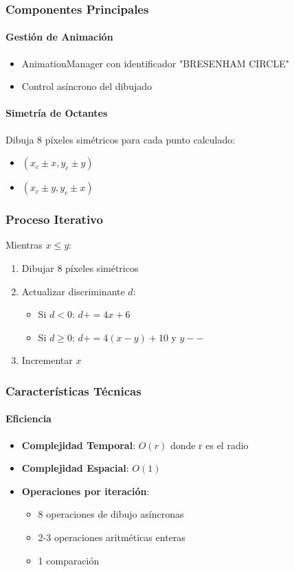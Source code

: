 \documentclass[12pt]{article}
\begin{document}
\subsubsection{Componentes Principales}
\paragraph{Gestión de Animación}
\begin{itemize}
    \item AnimationManager con identificador "BRESENHAM CIRCLE"
    \item Control asíncrono del dibujado
\end{itemize}

\paragraph{Simetría de Octantes}
Dibuja 8 píxeles simétricos para cada punto calculado:
\begin{itemize}
    \item $(x_c \pm x, y_c \pm y)$
    \item $(x_c \pm y, y_c \pm x)$
\end{itemize}

\subsubsection{Proceso Iterativo}
Mientras $x \leq y$:
\begin{enumerate}
    \item Dibujar 8 píxeles simétricos
    \item Actualizar discriminante $d$:
    \begin{itemize}
        \item Si $d < 0$: $d += 4x + 6$
        \item Si $d \geq 0$: $d += 4(x-y) + 10$ y $y--$
    \end{itemize}
    \item Incrementar $x$
\end{enumerate}

\subsubsection{Características Técnicas}
\paragraph{Eficiencia}
\begin{itemize}
    \item \textbf{Complejidad Temporal}: $O(r)$ donde r es el radio
    \item \textbf{Complejidad Espacial}: $O(1)$
    \item \textbf{Operaciones por iteración}:
    \begin{itemize}
        \item 8 operaciones de dibujo asíncronas
        \item 2-3 operaciones aritméticas enteras
        \item 1 comparación
    \end{itemize}
\end{itemize}
\end{document}
